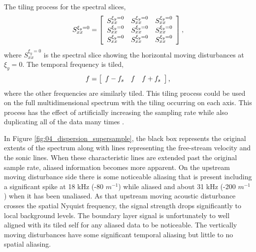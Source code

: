 The tiling process for the spectral slices,
\begin{equation}
  S_{xx}^{\xi_y=0} = \left[
    \begin{array}{c c c}
      S_{xx}^{\xi_y=0} & S_{xx}^{\xi_y=0} & S_{xx}^{\xi_y=0} \\
      S_{xx}^{\xi_y=0} & S_{xx}^{\xi_y=0} & S_{xx}^{\xi_y=0} \\
      S_{xx}^{\xi_y=0} & S_{xx}^{\xi_y=0} & S_{xx}^{\xi_y=0}
    \end{array}
  \right] \textrm{,}
\end{equation}
where $S_{xx}^{\xi_y=0}$ is the spectral slice showing the horizontal moving disturbances at $\xi_y=0$.
The temporal frequency is tiled,
\begin{equation}
  f = \left[
    \begin{array}{c c c}
      f-f_s & f & f+f_s
    \end{array}
  \right] \textrm{,}
\end{equation}
where the other frequencies are similarly tiled.
This tiling process could be used on the full multidimensional spectrum with the tiling occurring on each axis.
This process has the effect of artificially increasing the sampling rate while also duplicating all of the data many times \cite{Lynch-2021-DygYkEGU}.

In Figure \ref{fig:04_dispersion_supersample}, the black box represents the original extents of the spectrum along with lines representing the free-stream velocity and the sonic lines.
When these characteristic lines are extended past the original sample rate, aliased information becomes more apparent.
On the upstream moving disturbance side there is some noticeable aliasing that is present including a significant spike at 18 kHz (-80 $m^{-1}$) while aliased and about 31 kHz (-200 $m^{-1}$) when it has been unaliased.
As that upstream moving acoustic disturbance crosses the spatial Nyquist frequency, the signal strength drops significantly to local background levels.
The boundary layer signal is unfortunately to well aligned with its tiled self for any aliased data to be noticeable.
The vertically moving disturbances have some significant temporal aliasing but little to no spatial aliasing.


